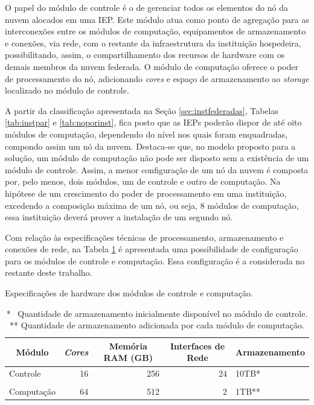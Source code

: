 \documentclass[tese,capa]{texufpel}
\begin{document}
O papel do módulo de controle é o de gerenciar todos os elementos do nó da nuvem alocados em uma IEP. Este módulo atua como ponto de agregação para as interconexões entre os módulos de computação, equipamentos de armazenamento e conexões, via rede, com o restante da infraestrutura da instituição hospedeira, possibilitando, assim, o compartilhamento dos recursos de hardware com os demais membros da nuvem federada. O módulo de computação oferece o poder de processamento do nó, adicionando \emph{cores} e espaço de armazenamento ao \emph{storage} localizado no módulo de controle.

A partir da classificação apresentada na Seção \ref{sec:instfederadas}, Tabelas \ref{tab:instpar} e \ref{tab:noporinst}, fica posto que as IEPs poderão dispor de até oito módulos de computação, dependendo do nível nos quais foram enquadradas, compondo assim um nó da nuvem. Destaca-se que, no modelo proposto para a solução, um módulo de computação não pode ser disposto sem a existência de um módulo de controle. Assim, a menor configuração de um nó da nuvem é composta por, pelo menos, dois módulos, um de controle e outro de computação. Na hipótese de um crescimento do poder de processamento em uma instituição, excedendo a composição máxima de um nó, ou seja, 8 módulos de computação, essa instituição deverá prover a instalação de um segundo nó.

Com relação às especificações técnicas de processamento, armazenamento e conexões de rede, na Tabela \ref{tab:modulosespec} é apresentada uma possibilidade de configuração para os módulos de controle e computação. Essa configuração é a considerada no restante deste trabalho.

\begin{table}[H]
    \centering
    \caption{Especificações de hardware dos módulos de controle e computação.}
    \label{tab:modulosespec}
    \begin{tabular}{@{}lrrrl@{}}
        \toprule
        \multicolumn{1}{c}{\textbf{Módulo}} &
        \multicolumn{1}{c}{\textit{\textbf{Cores}}} &
        \multicolumn{1}{c}{\textbf{Memória RAM (GB)}} &
        \multicolumn{1}{c}{\textbf{Interfaces de Rede}} &
        \multicolumn{1}{c}{\textbf{Armazenamento}} \\ \midrule
        Controle   & 16 & 256 & 24 & 10TB* \\
                   &    &     &    &               \\
        Computação & 64 & 512 & 2  & 1TB** \\ \bottomrule
    \end{tabular}
    \caption*{*~ Quantidade de armazenamento inicialmente disponível no módulo de controle.\\ ** Quantidade de armazenamento adicionada por cada módulo de computação.}
\end{table}
  
\end{document}
